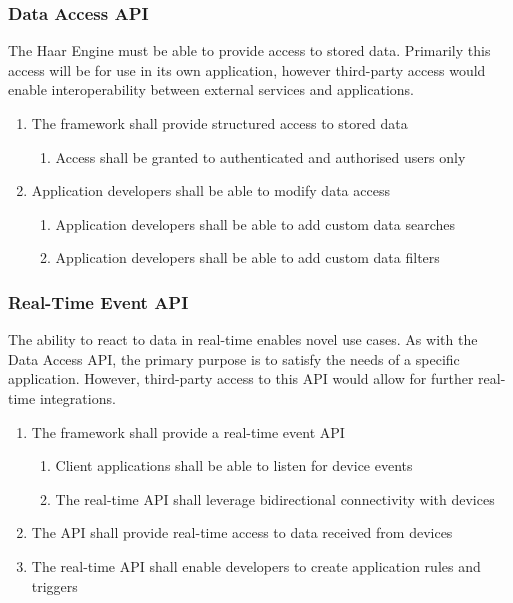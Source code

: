       \subsubsection{Data Access API}
        The Haar Engine must be able to provide access to stored data. Primarily this access will be for use in its own application, however third-party access would enable interoperability between external services and applications.

        \begin{enumerate}
          \item The framework shall provide structured access to stored data
          \begin{enumerate}
            \item Access shall be granted to authenticated and authorised users only
          \end{enumerate}
          \item Application developers shall be able to modify data access
          \begin{enumerate}
            \item Application developers shall be able to add custom data searches
            \item Application developers shall be able to add custom data filters
          \end{enumerate}
        \end{enumerate}

      \subsubsection{Real-Time Event API}
        The ability to react to data in real-time enables novel use cases. As with the Data Access API, the primary purpose is to satisfy the needs of a specific application. However, third-party access to this API would allow for further real-time integrations.

        \begin{enumerate}
          \item The framework shall provide a real-time event API
          \begin{enumerate}
            \item Client applications shall be able to listen for device events
            \item The real-time API shall leverage bidirectional connectivity with devices
          \end{enumerate}
          \item The API shall provide real-time access to data received from devices
          \item The real-time API shall enable developers to create application rules and triggers
        \end{enumerate}

